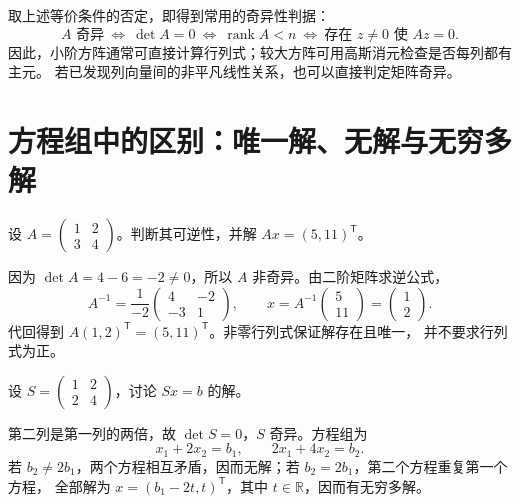 \documentclass[UTF8,12pt,a4paper,fontset=fandol]{ctexart}
\begin{document}
取上述等价条件的否定，即得到常用的奇异性判据：
\begin{equation}
  A\text{ 奇异}
  \ \Longleftrightarrow\ \det A=0
  \ \Longleftrightarrow\ \operatorname{rank}A<n
  \ \Longleftrightarrow\ \text{存在 }z\ne0\text{ 使 }Az=0.
  \label{eq:singular-criteria}
\end{equation}
因此，小阶方阵通常可直接计算行列式；较大方阵可用高斯消元检查是否每列都有主元。
若已发现列向量间的非平凡线性关系，也可以直接判定矩阵奇异。

\section{方程组中的区别：唯一解、无解与无穷多解}

\begin{example}[非奇异矩阵]
设 $A=\begin{pmatrix}1&2\\3&4\end{pmatrix}$。判断其可逆性，并解 $Ax=(5,11)^{\mathsf T}$。
\end{example}

\begin{solve}
因为 $\det A=4-6=-2\ne0$，所以 $A$ 非奇异。由二阶矩阵求逆公式，
\[
  A^{-1}=\frac1{-2}\begin{pmatrix}4&-2\\-3&1\end{pmatrix},\qquad
  x=A^{-1}\begin{pmatrix}5\\11\end{pmatrix}=\begin{pmatrix}1\\2\end{pmatrix}.
\]
代回得到 $A(1,2)^{\mathsf T}=(5,11)^{\mathsf T}$。非零行列式保证解存在且唯一，
并不要求行列式为正。
\end{solve}

\begin{example}[奇异矩阵]
设 $S=\begin{pmatrix}1&2\\2&4\end{pmatrix}$，讨论 $Sx=b$ 的解。
\end{example}

\begin{solve}
第二列是第一列的两倍，故 $\det S=0$，$S$ 奇异。方程组为
\[
  x_1+2x_2=b_1,\qquad 2x_1+4x_2=b_2.
\]
若 $b_2\ne2b_1$，两个方程相互矛盾，因而无解；若 $b_2=2b_1$，第二个方程重复第一个方程，
全部解为 $x=(b_1-2t,t)^{\mathsf T}$，其中 $t\in\mathbb R$，因而有无穷多解。
\end{solve}
\end{document}
